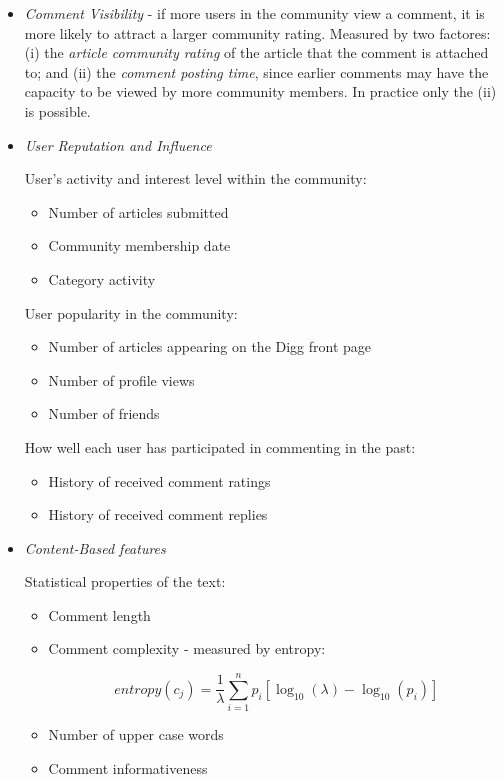 \documentclass{article}
\begin{document}
\begin{itemize}
\item \textit{Comment Visibility} - if more users in the community view a
comment, it is more likely to attract a larger community rating. Measured by two factores: (i) the \textit{article community rating} of the article that the comment is attached to; and (ii) the \textit{comment posting time}, since earlier comments may have the capacity to be viewed by more community members. In practice only the (ii) is possible.

\item \textit{User Reputation and Influence}

User’s activity and interest level within the community:
\begin{itemize}
\item Number of articles submitted
\item Community membership date
\item Category activity
\end{itemize}

User popularity in the community:
\begin{itemize}
\item Number of articles appearing on the Digg front page
\item Number of profile views
\item Number of friends
\end{itemize}

How well each user has participated in commenting in the past: 
\begin{itemize}
\item History of received comment ratings
\item History of received comment replies
\end{itemize}

\item \textit{Content-Based features}

Statistical properties of the text:
\begin{itemize}
\item Comment length
\item Comment complexity - measured by entropy:

\[
entropy(c_j) = \frac{1}{\lambda} \sum_{i=1}^{n} p_i[\log_{10} (\lambda) - \log_{10} (p_i)]
\]

\item Number of upper case words
\item Comment informativeness


\end{itemize}
\end{itemize}
\end{document}

